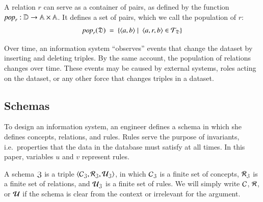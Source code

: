 \documentclass{elsarticle}
\begin{document}
   A relation $r$ can serve as a container of pairs,
   as defined by the function $\text{\it pop\/}_r:\mathbb{D}\rightarrow\mathbb{A}\times\mathbb{A}$.
   It defines a set of pairs, which we call the population of $r$:
\begin{equation}
   \pop{r}{\dataset}\ =\ \{ \pair{a}{b}\mid\ \triple{a}{r}{b}\in\triples_{\dataset}\}
   \label{eqn:pop}
\end{equation}

   Over time, an information system ``observes'' events that change the dataset by inserting and deleting triples.
   By the same account, the population of relations changes over time.
   These events may be caused by external systems, roles acting on the dataset, or any other force that changes triples in a dataset.

\subsection{Schemas}
\label{sct:Schemas}
   To design an information system, an engineer defines a schema in which she defines concepts, relations, and rules.
   Rules serve the purpose of invariants,
   i.e.\ properties that the data in the database must satisfy at all times.
   In this paper, variables $u$ and $v$ represent rules.

   A schema $\mathfrak{Z}$ is a triple $\langle{\mathcal{C}_{\mathfrak{Z}}},{\mathcal{R}_{\mathfrak{Z}}},{\mathcal{U}_{\mathfrak{Z}}}\rangle$,
   in which $\mathcal{C}_{\mathfrak{Z}}$ is a finite set of concepts,
   $\mathcal{R}_{\mathfrak{Z}}$ is a finite set of relations,
   and $\mathcal{U}_{\mathfrak{Z}}$ is a finite set of rules.
   We will simply write $\mathcal{C}$, $\mathcal{R}$, or $\mathcal{U}$ if the schema is clear from the context or irrelevant for the argument.
\end{document}

